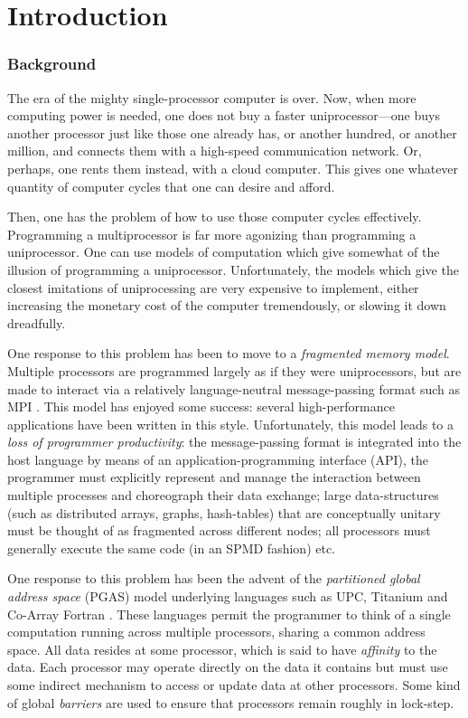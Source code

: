 \chapter{Introduction}

\subsection*{Background}



The era of the mighty single-processor computer is over. Now, when more
computing power is needed, one does not buy a faster uniprocessor---one buys
another processor just like those one already has, or another hundred, or
another million, and connects them with a high-speed communication network.
Or, perhaps, one rents them instead, with a cloud computer. This gives one
whatever quantity of computer cycles that one can desire and afford.

Then, one has the problem of how to use those computer cycles effectively.
Programming a multiprocessor is far more agonizing than programming a
uniprocessor.   One can use models of computation which give somewhat of the
illusion of programming a uniprocessor.  Unfortunately, the models which give
the closest imitations of uniprocessing are very expensive to implement,
either increasing the monetary cost of the computer tremendously, or slowing
it down dreadfully. 

One response to this problem has been to move to a {\em fragmented memory
  model}. Multiple processors are programmed largely as if they were
uniprocessors, but are made to interact via a relatively language-neutral
message-passing format such as MPI \cite{mpi}. This model has enjoyed some
success: several high-performance applications have been written in this
style. Unfortunately, this model leads to a {\em loss of programmer
  productivity}: the message-passing format is integrated into the host
language by means of an application-programming interface (API), the
programmer must explicitly represent and manage the interaction between
multiple processes and choreograph their data exchange; large data-structures
(such as distributed arrays, graphs, hash-tables) that are conceptually
unitary must be thought of as fragmented across different nodes; all
processors must generally execute the same code (in an SPMD fashion) etc.

One response to this problem has been the advent of the {\em
partitioned global address space} (PGAS) model underlying languages
such as UPC, Titanium and Co-Array Fortran \cite{pgas,titanium}. These
languages permit the programmer to think of a single computation
running across multiple processors, sharing a common address
space. All data resides at some processor, which is said to have {\em
affinity} to the data.  Each processor may operate directly on the
data it contains but must use some indirect mechanism to access or
update data at other processors. Some kind of global {\em barriers}
are used to ensure that processors remain roughly in lock-step.

